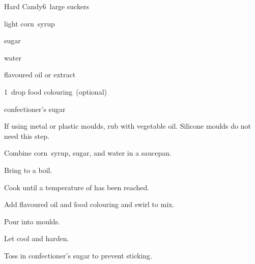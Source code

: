 \begin{recipe}{Hard Candy}{}{6~large suckers}

\begin{ingredients}
\item \C{\third} light corn~syrup
\item {} sugar
\item \C{\half} water
\item \tp{\eighth} flavoured oil or \tp{\quarter} extract
\item 1~drop food colouring~(optional)
\item confectioner's sugar
\end{ingredients}

\begin{directions}
\item If using metal or plastic moulds, rub with vegetable oil. Silicone moulds do not need this step.
\item Combine corn~syrup, sugar, and water in a saucepan.
\item Bring to a boil.
\item Cook until a temperature of  has been reached.
\item Add flavoured oil and food colouring and swirl to mix.
\item Pour into moulds.
\item Let cool and harden.
\item Toss in confectioner's sugar to prevent sticking.
\end{directions}

\end{recipe}
